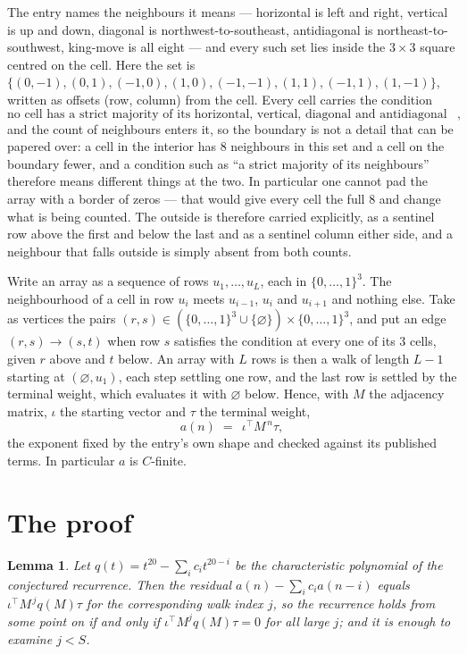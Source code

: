 \documentclass[11pt,a4paper]{article}
\theoremstyle{plain}
\newtheorem{lemma}[theorem]{Lemma}
\theoremstyle{definition}
\begin{document}
The entry names the neighbours it means --- horizontal is left and right, vertical is up and
down, diagonal is northwest-to-southeast, antidiagonal is northeast-to-southwest, king-move is
all eight --- and every such set lies inside the $3\times3$ square centred on the cell. Here
the set is $\{(0,-1), (0,1), (-1,0), (1,0), (-1,-1), (1,1), (-1,1), (1,-1)\}$, written as offsets (row, column) from the cell. Every cell carries
the condition
\[
\text{no cell has a strict majority of its horizontal, vertical, diagonal and antidiagonal neighbours equal to 1},
\]
and the count of neighbours enters it, so the boundary is not a detail that can be papered
over: a cell in the interior has $8$ neighbours in this set and a cell on the boundary
fewer, and a condition such as ``a strict majority of its neighbours'' therefore means
different things at the two. In particular one cannot pad the array with a border of zeros ---
that would give every cell the full $8$ and change what is being counted. The outside is
therefore carried
explicitly, as a sentinel row above the first and below the last and as a sentinel column
either side, and a neighbour that falls outside is simply absent from both counts.

Write an array as a sequence of rows $u_1,\dots,u_L$, each in
$\{0,\dots,1\}^{3}$. The neighbourhood of a cell in row $u_i$ meets $u_{i-1}$,
$u_i$ and $u_{i+1}$ and nothing else. Take as vertices the pairs
$(r,s)\in(\{0,\dots,1\}^{3}\cup\{\varnothing\})\times\{0,\dots,1\}^{3}$,
and put an edge $(r,s)\to(s,t)$ when row $s$ satisfies the condition at every one of its
$3$ cells, given $r$ above and $t$ below. An array with $L$ rows is then a walk of length
$L-1$ starting at $(\varnothing,u_1)$, each step settling one row, and the last row is
settled by the terminal weight, which evaluates it with $\varnothing$ below. Hence,
with $M$ the adjacency matrix, $\iota$ the starting vector and $\tau$ the terminal weight,
\[
a(n)\;=\;\,\iota^{\!\top}M^{\,n}\tau ,
\]
the exponent fixed by the entry's own shape and checked against its published terms. In
particular $a$ is $C$-finite.

\section{The proof}

\begin{lemma}\label{lem:crit}
Let $q(t)=t^{20}-\sum_i c_it^{20-i}$ be the characteristic polynomial of the
conjectured recurrence. Then the residual $a(n)-\sum_ic_ia(n-i)$ equals
$\iota^{\!\top}M^{\,j}q(M)\tau$ for the corresponding walk index $j$, so the
recurrence holds from some point on if and only if $\iota^{\!\top}M^{j}q(M)\tau=0$ for all
large $j$; and it is enough to examine $j<S$.
\end{lemma}
\end{document}
